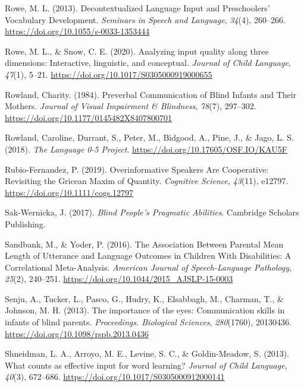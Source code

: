 \documentclass[
  man]{apa6}
\newlength{\cslhangindent}
\newlength{\cslentryspacingunit} %
\newenvironment{CSLReferences}[2] %
 {%
  \setlength{\parindent}{0pt}
  \ifodd #1
  \let\oldpar\par
  \def\par{\hangindent=\cslhangindent\oldpar}
  \fi
  \setlength{\parskip}{#2\cslentryspacingunit}
 }%
 {}
\begin{document}
\begin{CSLReferences}{1}{0}
\leavevmode{}%
Rowe, M. L. (2013). Decontextualized {Language Input} and {Preschoolers}' {Vocabulary Development}. \emph{Seminars in Speech and Language}, \emph{34}(4), 260--266. \url{https://doi.org/10.1055/s-0033-1353444}

\leavevmode{}%
Rowe, M. L., \& Snow, C. E. (2020). Analyzing input quality along three dimensions: Interactive, linguistic, and conceptual. \emph{Journal of Child Language}, \emph{47}(1), 5--21. \url{https://doi.org/10.1017/S0305000919000655}

\leavevmode{}%
Rowland, Charity. (1984). Preverbal {Communication} of {Blind Infants} and {Their Mothers}. \emph{Journal of Visual Impairment \& Blindness}, \emph{78}(7), 297--302. \url{https://doi.org/10.1177/0145482X8407800701}

\leavevmode{}%
Rowland, Caroline, Durrant, S., Peter, M., Bidgood, A., Pine, J., \& Jago, L. S. (2018). \emph{The {Language} 0-5 {Project}}. \url{https://doi.org/10.17605/OSF.IO/KAU5F}

\leavevmode{}%
Rubio-Fernandez, P. (2019). Overinformative {Speakers Are Cooperative}: {Revisiting} the {Gricean Maxim} of {Quantity}. \emph{Cognitive Science}, \emph{43}(11), e12797. \url{https://doi.org/10.1111/cogs.12797}

\leavevmode{}%
Sak-Wernicka, J. (2017). \emph{Blind {People}'s {Pragmatic Abilities}}. Cambridge Scholars Publishing.

\leavevmode{}%
Sandbank, M., \& Yoder, P. (2016). The {Association Between Parental Mean Length} of {Utterance} and {Language Outcomes} in {Children With Disabilities}: {A Correlational Meta-Analysis}. \emph{American Journal of Speech-Language Pathology}, \emph{25}(2), 240--251. \url{https://doi.org/10.1044/2015_AJSLP-15-0003}

\leavevmode{}%
Senju, A., Tucker, L., Pasco, G., Hudry, K., Elsabbagh, M., Charman, T., \& Johnson, M. H. (2013). The importance of the eyes: Communication skills in infants of blind parents. \emph{Proceedings. Biological Sciences}, \emph{280}(1760), 20130436. \url{https://doi.org/10.1098/rspb.2013.0436}

\leavevmode{}%
Shneidman, L. A., Arroyo, M. E., Levine, S. C., \& Goldin-Meadow, S. (2013). What counts as effective input for word learning? \emph{Journal of Child Language}, \emph{40}(3), 672--686. \url{https://doi.org/10.1017/S0305000912000141}


\end{CSLReferences}
\end{document}
